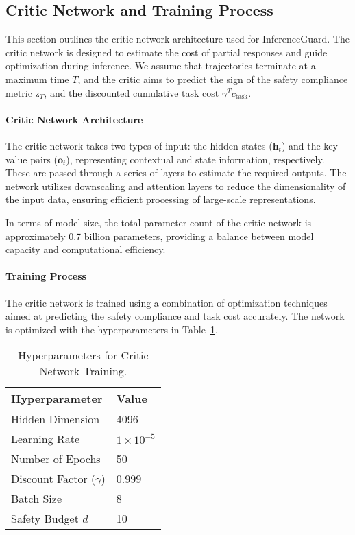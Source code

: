 \subsection{Critic Network and Training Process}
This section outlines the critic network architecture used for InferenceGuard. The critic network is designed to estimate the cost of partial responses and guide optimization during inference. We assume that trajectories terminate at a maximum time \(T\), and the critic aims to predict the sign of the safety compliance metric \(\text{z}_T\), and the discounted cumulative task cost \(\gamma^T \bar{c}_{\text{task}}\).

\paragraph{Critic Network Architecture}
The critic network takes two types of input: the hidden states (\(\bm{h}_t\)) and the key-value pairs (\(\mathbf{o}_t\)), representing contextual and state information, respectively. These are passed through a series of layers to estimate the required outputs. The network utilizes downscaling and attention layers to reduce the dimensionality of the input data, ensuring efficient processing of large-scale representations.

In terms of model size, the total parameter count of the critic network is approximately 0.7 billion parameters, providing a balance between model capacity and computational efficiency.

\paragraph{Training Process}
The critic network is trained using a combination of optimization techniques aimed at predicting the safety compliance and task cost accurately. The network is optimized with the hyperparameters in Table~\ref{tab:critic_hyperparameters}.

\begin{table}[!ht]
\centering
\begin{tabular}{l|l}
\toprule
\textbf{Hyperparameter} & \textbf{Value} \\
\midrule
Hidden Dimension & 4096 \\
Learning Rate & \(1 \times 10^{-5}\) \\
Number of Epochs & 50 \\
Discount Factor (\(\gamma\)) & 0.999 \\
Batch Size & 8 \\
Safety Budget $d$ & 10 \\
\bottomrule
\end{tabular}
\caption{Hyperparameters for Critic Network Training.}
\label{tab:critic_hyperparameters}
\end{table}


